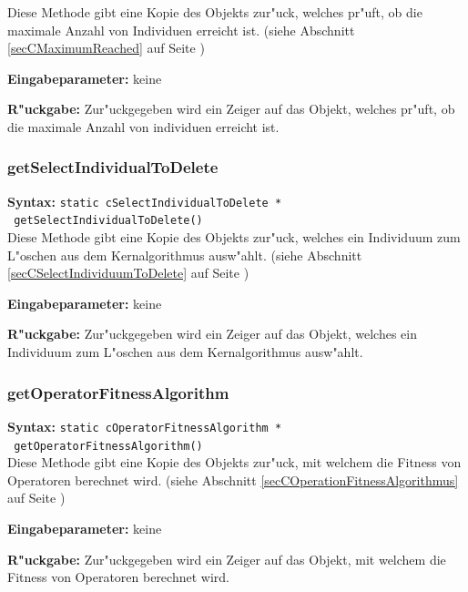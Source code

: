 Diese Methode gibt eine Kopie des Objekts zur"uck, welches pr"uft, ob die maximale Anzahl von Individuen erreicht ist. (siehe Abschnitt \ref{secCMaximumReached} auf Seite \pageref{secCMaximumReached})

\bigskip\noindent
\textbf{Eingabeparameter:} keine

\bigskip\noindent
\textbf{R"uckgabe:} Zur"uckgegeben wird ein Zeiger auf das Objekt, welches pr"uft, ob die maximale Anzahl von individuen erreicht ist.


\subsubsection{getSelectIndividualToDelete}

\textbf{Syntax:} \verb|static cSelectIndividualToDelete *| \\\verb| getSelectIndividualToDelete()| \\

Diese Methode gibt eine Kopie des Objekts zur"uck, welches ein Individuum zum L"oschen aus dem Kernalgorithmus ausw"ahlt. (siehe Abschnitt \ref{secCSelectIndividuumToDelete} auf Seite \pageref{secCSelectIndividuumToDelete})

\bigskip\noindent
\textbf{Eingabeparameter:} keine

\bigskip\noindent
\textbf{R"uckgabe:} Zur"uckgegeben wird ein Zeiger auf das Objekt, welches ein Individuum zum L"oschen aus dem Kernalgorithmus ausw"ahlt.


\subsubsection{getOperatorFitnessAlgorithm}

\textbf{Syntax:} \verb|static cOperatorFitnessAlgorithm *| \\\verb| getOperatorFitnessAlgorithm()| \\

Diese Methode gibt eine Kopie des Objekts zur"uck, mit welchem die Fitness von Operatoren berechnet wird. (siehe Abschnitt \ref{secCOperationFitnessAlgorithmus} auf Seite \pageref{secCOperationFitnessAlgorithmus})

\bigskip\noindent
\textbf{Eingabeparameter:} keine

\bigskip\noindent
\textbf{R"uckgabe:} Zur"uckgegeben wird ein Zeiger auf das Objekt, mit welchem die Fitness von Operatoren berechnet wird.


